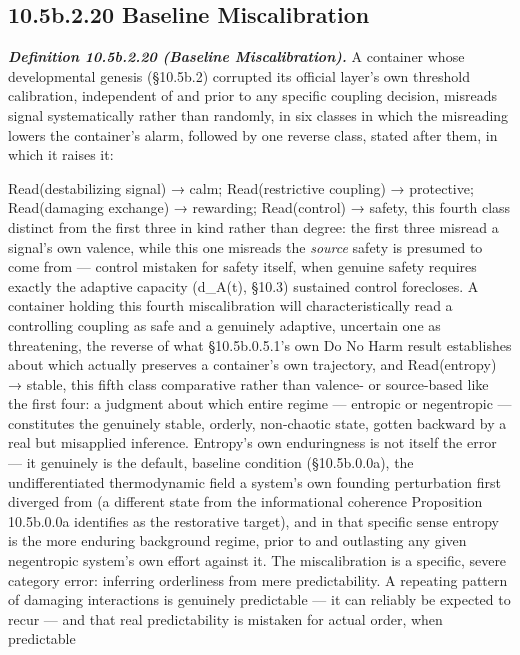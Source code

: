 \documentclass[
]{article}
\begin{document}
\hypertarget{b.2.20-baseline-miscalibration}{%
\subsection{10.5b.2.20 Baseline
Miscalibration}\label{b.2.20-baseline-miscalibration}}

\emph{\textbf{Definition 10.5b.2.20 (Baseline Miscalibration).}} A
container whose developmental genesis (§10.5b.2) corrupted its official
layer's own threshold calibration, independent of and prior to any
specific coupling decision, misreads signal systematically rather than
randomly, in six classes in which the misreading lowers the container's
alarm, followed by one reverse class, stated after them, in which it
raises it:

Read(destabilizing signal) → calm; Read(restrictive coupling) →
protective; Read(damaging exchange) → rewarding; Read(control) → safety,
this fourth class distinct from the first three in kind rather than
degree: the first three misread a signal's own valence, while this one
misreads the \emph{source} safety is presumed to come from --- control
mistaken for safety itself, when genuine safety requires exactly the
adaptive capacity (d\_A(t), §10.3) sustained control forecloses. A
container holding this fourth miscalibration will characteristically
read a controlling coupling as safe and a genuinely adaptive, uncertain
one as threatening, the reverse of what §10.5b.0.5.1's own Do No Harm
result establishes about which actually preserves a container's own
trajectory, and Read(entropy) → stable, this fifth class comparative
rather than valence- or source-based like the first four: a judgment
about which entire regime --- entropic or negentropic --- constitutes
the genuinely stable, orderly, non-chaotic state, gotten backward by a
real but misapplied inference. Entropy's own enduringness is not itself
the error --- it genuinely is the default, baseline condition
(§10.5b.0.0a), the undifferentiated thermodynamic field a system's own
founding perturbation first diverged from (a different state from the
informational coherence Proposition 10.5b.0.0a identifies as the
restorative target), and in that specific sense entropy is the more
enduring background regime, prior to and outlasting any given
negentropic system's own effort against it. The miscalibration is a
specific, severe category error: inferring orderliness from mere
predictability. A repeating pattern of damaging interactions is
genuinely predictable --- it can reliably be expected to recur --- and
that real predictability is mistaken for actual order, when predictable
\end{document}

